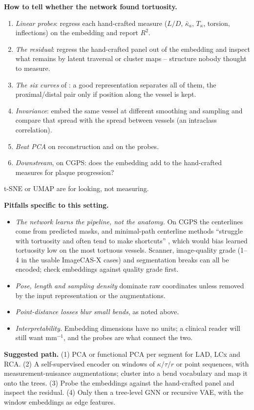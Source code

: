 \textbf{How to tell whether the network found tortuosity.}
\begin{enumerate}
  \item \emph{Linear probes}: regress each hand-crafted measure ($L/D$, $\bar\kappa_a$, $T_\kappa$,
    torsion, inflections) on the embedding and report $R^2$.
  \item \emph{The residual}: regress the hand-crafted panel out of the embedding and inspect what
    remains by latent traversal or cluster maps -- structure nobody thought to measure.
  \item \emph{The six curves} of : a good representation
    separates all of them, the proximal/distal pair only if position along the vessel is kept.
  \item \emph{Invariance}: embed the same vessel at different smoothing and sampling and compare
    that spread with the spread between vessels (an intraclass correlation).
  \item \emph{Beat PCA} on reconstruction and on the probes.
  \item \emph{Downstream}, on CGPS: does the embedding add to the hand-crafted measures for plaque
    progression?
\end{enumerate}
t-SNE or UMAP are for looking, not measuring.

\textbf{Pitfalls specific to this setting.}
\begin{itemize}
  \item \emph{The network learns the pipeline, not the anatomy.} On CGPS the centerlines come from
    predicted masks, and minimal-path centerline methods ``struggle with tortuosity and often tend
    to make shortcuts'' \cite{korona2025tracing}, which would bias learned tortuosity low on the
    most tortuous vessels. Scanner, image-quality grade (1--4 in the usable ImageCAS-X cases) and
    segmentation breaks can all be encoded; check embeddings against quality grade first.
  \item \emph{Pose, length and sampling density} dominate raw coordinates unless removed by the
    input representation or the augmentations.
  \item \emph{Point-distance losses blur small bends}, as noted above.
  \item \emph{Interpretability.} Embedding dimensions have no units; a clinical reader will still
    want mm$^{-1}$, and the probes are what connect the two.
\end{itemize}

\textbf{Suggested path.}
(1) PCA or functional PCA per segment for LAD, LCx and RCA.
(2) A self-supervised encoder on windows of $\kappa/\tau/r$ or point sequences, with
measurement-nuisance augmentations; cluster into a bend vocabulary and map it onto the trees.
(3) Probe the embeddings against the hand-crafted panel and inspect the residual.
(4) Only then a tree-level GNN or recursive VAE, with the window embeddings as edge features.

